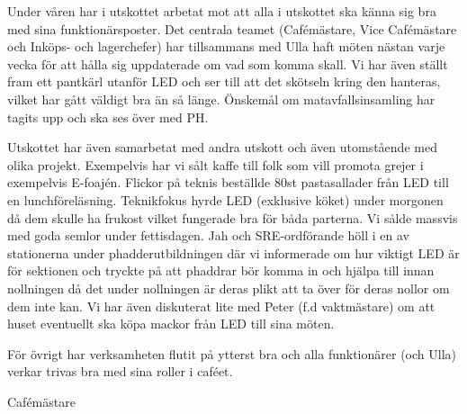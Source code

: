 \documentclass[../_main/handlingar.tex]{subfiles}
\begin{document}
Under våren har i utskottet arbetat mot att alla i utskottet ska känna sig bra med sina funktionärsposter. Det centrala teamet (Cafémästare, Vice Cafémästare och Inköps- och lagerchefer) har tillsammans med Ulla haft möten nästan varje vecka för att hålla sig uppdaterade om vad som komma skall. Vi har även ställt fram ett pantkärl utanför LED och ser till att det skötseln kring den hanteras, vilket har gått väldigt bra än så länge. Önskemål om matavfallsinsamling har tagits upp och ska ses över med PH.

Utskottet har även samarbetat med andra utskott och även utomstående med olika projekt. Exempelvis har vi sålt kaffe till folk som vill promota grejer i exempelvis E-foajén. Flickor på teknis beställde 80st pastasallader från LED till en lunchföreläsning. Teknikfokus hyrde LED (exklusive köket) under morgonen då dem skulle ha frukost vilket fungerade bra för båda parterna. Vi sålde massvis med goda semlor under fettisdagen. Jah och SRE-ordförande höll i en av stationerna under phadderutbildningen där vi informerade om hur viktigt LED är för sektionen och tryckte på att phaddrar bör komma in och hjälpa till innan nollningen då det under nollningen är deras plikt att ta över för deras nollor om dem inte kan. Vi har även diskuterat lite med Peter (f.d vaktmästare) om att huset eventuellt ska köpa mackor från LED till sina möten.

För övrigt har verksamheten flutit på ytterst bra och alla funktionärer (och Ulla) verkar trivas bra med sina roller i caféet.

\begin{signatures}{1}
    \mvh
    \signature{Daniel Bakic}{Cafémästare}
\end{signatures}
\end{document}
